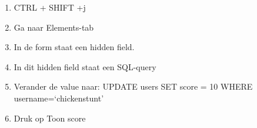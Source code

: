 \begin{enumerate}
  \item CTRL + SHIFT +j
  \item Ga naar Elements-tab
  \item In de form staat een hidden field.
  \item In dit hidden field staat een SQL-query
  \item Verander de value naar: UPDATE users SET score = 10 WHERE username=`chickenstunt'
  \item Druk op Toon score
\end{enumerate}